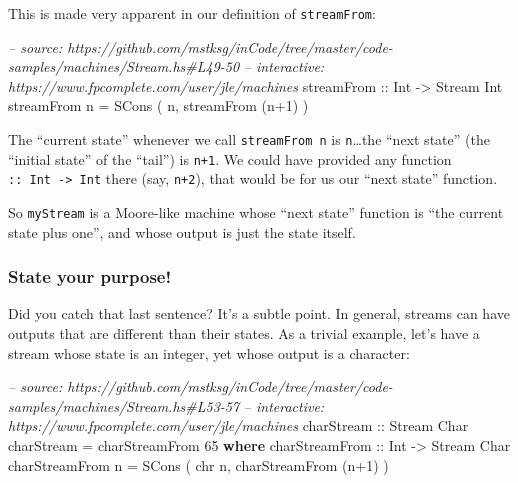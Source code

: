 \documentclass[]{article}
\newenvironment{Shaded}{}{}
\newcommand{\KeywordTok}[1]{\textcolor[rgb]{0.00,0.44,0.13}{\textbf{{#1}}}}
\newcommand{\DataTypeTok}[1]{\textcolor[rgb]{0.56,0.13,0.00}{{#1}}}
\newcommand{\DecValTok}[1]{\textcolor[rgb]{0.25,0.63,0.44}{{#1}}}
\newcommand{\CommentTok}[1]{\textcolor[rgb]{0.38,0.63,0.69}{\textit{{#1}}}}
\newcommand{\OtherTok}[1]{\textcolor[rgb]{0.00,0.44,0.13}{{#1}}}
\newcommand{\FunctionTok}[1]{\textcolor[rgb]{0.02,0.16,0.49}{{#1}}}
\newcommand{\NormalTok}[1]{{#1}}
\begin{document}
This is made very apparent in our definition of \texttt{streamFrom}:

\begin{Shaded}
\begin{Highlighting}[]
\CommentTok{-- source: https://github.com/mstksg/inCode/tree/master/code-samples/machines/Stream.hs#L49-50}
\CommentTok{-- interactive: https://www.fpcomplete.com/user/jle/machines}
\OtherTok{    streamFrom ::} \DataTypeTok{Int} \OtherTok{->} \DataTypeTok{Stream} \DataTypeTok{Int}
    \NormalTok{streamFrom n }\FunctionTok{=} \DataTypeTok{SCons} \NormalTok{( n, streamFrom (n}\FunctionTok{+}\DecValTok{1}\NormalTok{) )}
\end{Highlighting}
\end{Shaded}

The ``current state'' whenever we call \texttt{streamFrom\ n} is
\texttt{n}\ldots{}the ``next state'' (the ``initial state'' of the
``tail'') is \texttt{n+1}. We could have provided any function
\texttt{::\ Int\ -\textgreater{}\ Int} there (say, \texttt{n+2}), that
would be for us our ``next state'' function.

So \texttt{myStream} is a Moore-like machine whose ``next state''
function is ``the current state plus one'', and whose output is just the
state itself.

\subsubsection{State your purpose!}\label{state-your-purpose}

Did you catch that last sentence? It's a subtle point. In general,
streams can have outputs that are different than their states. As a
trivial example, let's have a stream whose state is an integer, yet
whose output is a character:

\begin{Shaded}
\begin{Highlighting}[]
\CommentTok{-- source: https://github.com/mstksg/inCode/tree/master/code-samples/machines/Stream.hs#L53-57}
\CommentTok{-- interactive: https://www.fpcomplete.com/user/jle/machines}
\OtherTok{charStream ::} \DataTypeTok{Stream} \DataTypeTok{Char}
\NormalTok{charStream }\FunctionTok{=} \NormalTok{charStreamFrom }\DecValTok{65}
  \KeywordTok{where}
\OtherTok{    charStreamFrom ::} \DataTypeTok{Int} \OtherTok{->} \DataTypeTok{Stream} \DataTypeTok{Char}
    \NormalTok{charStreamFrom n }\FunctionTok{=} \DataTypeTok{SCons} \NormalTok{( chr n, charStreamFrom (n}\FunctionTok{+}\DecValTok{1}\NormalTok{) )}
\end{Highlighting}
\end{Shaded}
\end{document}
